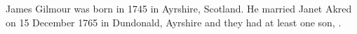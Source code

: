 
James Gilmour was born in 1745 in Ayrshire, Scotland.
He married Janet Akred on 15 December 1765 in Dundonald, Ayrshire and they had at least one son, .

